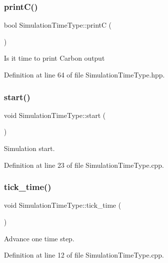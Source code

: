 \subsubsection{\texorpdfstring{print\+C()}{printC()}}
{\footnotesize\ttfamily bool Simulation\+Time\+Type\+::printC (\begin{DoxyParamCaption}{ }\end{DoxyParamCaption})\hspace{0.3cm}{\ttfamily [inline]}}

Is it time to print Carbon output 

Definition at line 64 of file Simulation\+Time\+Type.\+hpp.

\mbox{\label{class_simulation_time_type_a271e291f8da1ae72337d456ce3899f3c}} 
\subsubsection{\texorpdfstring{start()}{start()}}
{\footnotesize\ttfamily void Simulation\+Time\+Type\+::start (\begin{DoxyParamCaption}{ }\end{DoxyParamCaption})}

Simulation start. 

Definition at line 23 of file Simulation\+Time\+Type.\+cpp.

\mbox{\label{class_simulation_time_type_a5a0171330f407e1293c6fdf489055278}} 
\subsubsection{\texorpdfstring{tick\+\_\+time()}{tick\_time()}}
{\footnotesize\ttfamily void Simulation\+Time\+Type\+::tick\+\_\+time (\begin{DoxyParamCaption}{ }\end{DoxyParamCaption})}

Advance one time step. 

Definition at line 12 of file Simulation\+Time\+Type.\+cpp.



